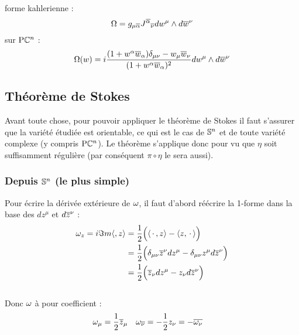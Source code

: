 forme kahlerienne :
\begin{equation}
	\Omega = g_{\mu \congu{\alpha}} {J^{\congu{\alpha}}}_{\congu{\nu}} dw^\mu \wedge d\congu{w}^\nu
\end{equation}
sur $\PC{n}$ :
\[\Omega(w) = i\frac{(1+w^\alpha \congu{w}_\alpha)\delta_{\mu\nu} - w_\mu \congu{w}_\nu}{(1+w^\alpha \congu{w}_\alpha)^2} dw^\mu \wedge d\congu{w}^\nu\]
\skipl



\subsection{Théorème de Stokes} \label{ann:stokes}

Avant toute chose, pour pouvoir appliquer le théorème de Stokes il faut s'assurer que la variété étudiée est orientable, ce qui est le cas de $\S{n}$ et de toute variété complexe (y compris $\PC{n}$). Le théorème s'applique donc pour vu que $\eta$ soit suffisamment régulière (par conséquent $\pi\circ\eta$ le sera aussi).
\\

\subsubsection{Depuis $\S{n}$ (le plus simple)}

Pour écrire la dérivée extérieure de $\conn$, il faut d'abord réécrire la 1-forme dans la base des $dz^\mu$ et $d\congu{z}^\nu$ :
\begin{align*}
	\conn_z = i\Im m \langle , z\rangle &= \frac{1}{2}\Big( \langle\, \cdot\, , z \rangle - \langle z,\, \cdot\, \rangle \Big) \\
	&= \frac{1}{2}\Big( \delta_{\mu\nu} \congu{z}^\nu dz^\mu -  \delta_{\mu\nu} z^\mu d\congu{z}^\nu \Big) \\
	&= \frac{1}{2}\Big( \congu{z}_\nu dz^\mu -  z_\nu d\congu{z}^\nu \Big)
\end{align*}
\\
Donc $\conn$ à pour coefficient :
\begin{align} \label{eq:sym2conn}
	\conn_\mu &= \frac{1}{2} \congu{z}_\mu  &  \conn_{\congu{\nu}} &= - \frac{1}{2} z_\nu = -\congu{\conn_\nu}
\end{align}
\skipl

